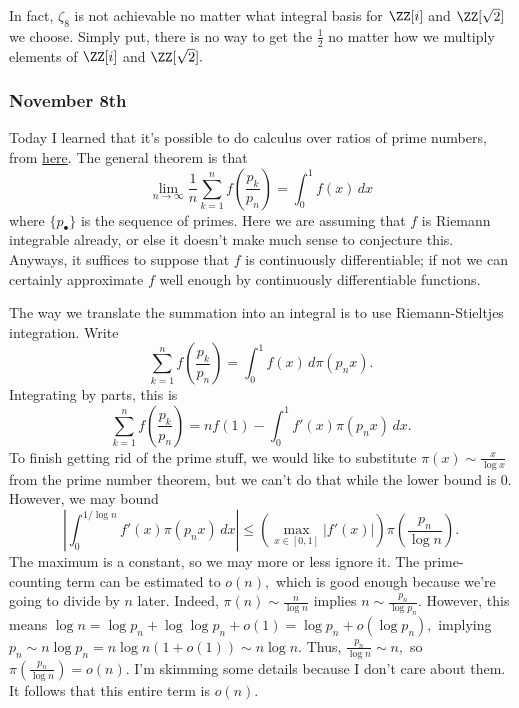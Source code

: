 In fact, $\zeta_8$ is not achievable no matter what integral basis for $\ZZ[i]$ and $\ZZ[\sqrt2]$ we choose. Simply put, there is no way to get the $\frac12$ no matter how we multiply elements of $\ZZ[i]$ and $\ZZ[\sqrt2].$

\subsubsection{November 8th}
Today I learned that it's possible to do calculus over ratios of prime numbers, from \href{https://mathoverflow.net/questions/311085/riemann-sum-formula-for-definite-integral-using-prime-numbers}{here}. The general theorem is that
\[\lim_{n\to\infty}\frac1n\sum_{k=1}^nf\left(\frac{p_k}{p_n}\right)=\int_0^1f(x)\,dx\]
where $\{p_\bullet\}$ is the sequence of primes. Here we are assuming that $f$ is Riemann integrable already, or else it doesn't make much sense to conjecture this. Anyways, it suffices to suppose that $f$ is continuously differentiable; if not we can certainly approximate $f$ well enough by continuously differentiable functions.

The way we translate the summation into an integral is to use Riemann-Stieltjes integration. Write
\[\sum_{k=1}^nf\left(\frac{p_k}{p_n}\right)=\int_0^1f(x)\,d\pi(p_nx).\]
Integrating by parts, this is
\[\sum_{k=1}^nf\left(\frac{p_k}{p_n}\right)=nf(1)-\int_0^1f'(x)\pi(p_nx)\,dx.\]
To finish getting rid of the prime stuff, we would like to substitute $\pi(x)\sim\frac x{\log x}$ from the prime number theorem, but we can't do that while the lower bound is $0.$ However, we may bound
\[\left|\int_0^{1/\log n}f'(x)\pi(p_nx)\,dx\right|\le\left(\max_{x\in[0,1]}\left|f'(x)\right|\right)\pi\left(\frac{p_n}{\log n}\right).\]
The maximum is a constant, so we may more or less ignore it. The prime-counting term can be estimated to $o(n),$ which is good enough because we're going to divide by $n$ later. Indeed, $\pi(n)\sim\frac n{\log n}$ implies $n\sim\frac{p_n}{\log p_n}.$ However, this means $\log n=\log p_n+\log\log p_n+o(1)=\log p_n+o(\log p_n),$ implying $p_n\sim n\log p_n=n\log n(1+o(1))\sim n\log n.$ Thus, $\frac{p_n}{\log n}\sim n,$ so $\pi\left(\frac{p_n}{\log n}\right)=o(n).$ I'm skimming some details because I don't care about them. It follows that this entire term is $o(n).$

